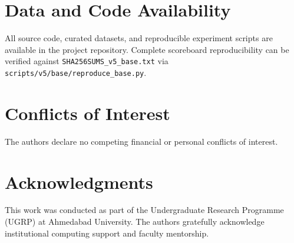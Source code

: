 \documentclass[11pt,a4paper]{article}
\begin{document}
\section*{Data and Code Availability}
All source code, curated datasets, and reproducible experiment scripts are available in the project repository. Complete scoreboard reproducibility can be verified against \texttt{SHA256SUMS\_v5\_base.txt} via \texttt{scripts/v5/base/reproduce\_base.py}.

\section*{Conflicts of Interest}
The authors declare no competing financial or personal conflicts of interest.

\section*{Acknowledgments}
This work was conducted as part of the Undergraduate Research Programme (UGRP) at Ahmedabad University. The authors gratefully acknowledge institutional computing support and faculty mentorship.



\end{document}
